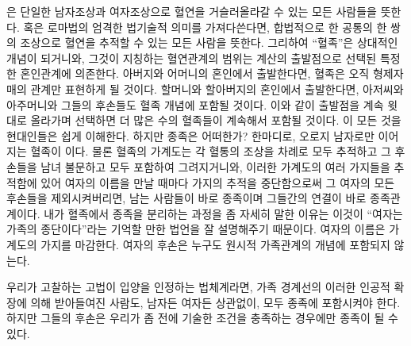 은 단일한 남자조상과 여자조상으로 혈연을 거슬러올라갈 수 있는
모든 사람들을 뜻한다.
혹은 로마법의 엄격한 법기술적 의미를 가져다쓴다면,
합법적으로 한 공통의 한 쌍의 조상으로
혈연을 추적할 수 있는 모든 사람을 뜻한다.
그리하여 ``혈족''은 상대적인 개념이 되거니와,
그것이 지칭하는 혈연관계의 범위는 계산의 출발점으로 선택된
특정한 혼인관계에 의존한다.
아버지와 어머니의 혼인에서 출발한다면, 혈족은 오직
형제자매의 관계만 표현하게 될 것이다.
할머니와 할아버지의 혼인에서 출발한다면, 아저씨와 아주머니와 그들의 후손들도
혈족 개념에 포함될 것이다.
이와 같이 출발점을 계속 윗대로 올라가며 선택하면 더 많은 수의 혈족들이
계속해서 포함될 것이다.
이 모든 것을 현대인들은 쉽게 이해한다.
하지만 종족은 어떠한가?
한마디로, 오로지 남자로만 이어지는 혈족이 이다.
물론 혈족의 가계도는 각 혈통의 조상을 차례로 모두 추적하고
그 후손들을 남녀 불문하고 모두 포함하여 그려지거니와,
이러한 가계도의 여러 가지들을 추적함에 있어
여자의 이름을 만날 때마다 가지의 추적을 중단함으로써
그 여자의 모든 후손들을 제외시켜버리면,
남는 사람들이 바로 종족이며 그들간의 연결이 바로 종족관계이다.
내가 혈족에서 종족을 분리하는 과정을 좀 자세히 말한 이유는 이것이
``여자는 가족의 종단이다''라는
기억할 만한 법언을 잘 설명해주기 때문이다.
여자의 이름은 가계도의 가지를 마감한다.
여자의 후손은 누구도 원시적 가족관계의 개념에 포함되지 않는다.

우리가 고찰하는 고법이 입양을 인정하는 법체계라면,
가족 경계선의 이러한 인공적 확장에 의해 받아들여진 사람도,
남자든 여자든 상관없이, 모두 종족에 포함시켜야 한다.
하지만 그들의 후손은 우리가 좀 전에 기술한 조건을 충족하는 경우에만
종족이 될 수 있다.

